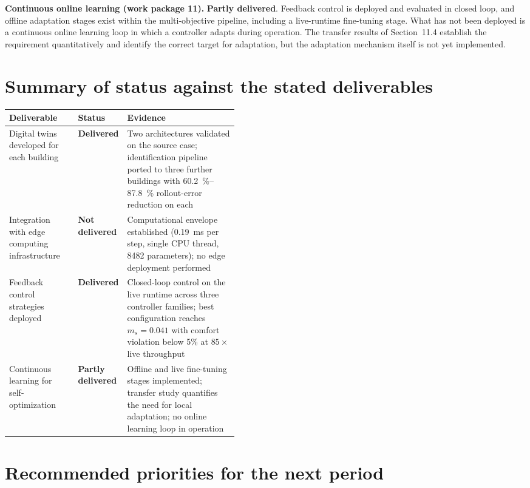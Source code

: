 \documentclass[11pt,a4paper]{article}
\newcommand{\ms}{\ensuremath{m_s}}
\newcommand{\done}{\textcolor{black!70}{\textbf{Delivered}}}
\newcommand{\partialx}{\textcolor{black!70}{\textbf{Partly delivered}}}
\newcommand{\notdone}{\textcolor{black!70}{\textbf{Not delivered}}}
\begin{document}
\textbf{Continuous online learning (work package 11).} \partialx. Feedback control is deployed
and evaluated in closed loop, and offline adaptation stages exist within the multi-objective
pipeline, including a live-runtime fine-tuning stage. What has not been deployed is a continuous
online learning loop in which a controller adapts during operation. The transfer results of
Section~11.4 establish the requirement quantitatively and identify the correct target for
adaptation, but the adaptation mechanism itself is not yet implemented.

\section*{Summary of status against the stated deliverables}

\begin{table}[h]
\centering\small
\begin{tabularx}{\linewidth}{@{}p{0.30\linewidth}p{0.14\linewidth}X@{}}
\toprule
Deliverable & Status & Evidence \\
\midrule
Digital twins developed for each building & \done & Two architectures validated on the source case; identification pipeline ported to three further buildings with \SIrange{60.2}{87.8}{\percent} rollout-error reduction on each \\
Integration with edge computing infrastructure & \notdone & Computational envelope established (\SI{0.19}{\milli\second} per step, single CPU thread, 8482 parameters); no edge deployment performed \\
Feedback control strategies deployed & \done & Closed-loop control on the live runtime across three controller families; best configuration reaches $\ms = 0.041$ with comfort violation below 5\% at $85\times$ live throughput \\
Continuous learning for self-optimization & \partialx & Offline and live fine-tuning stages implemented; transfer study quantifies the need for local adaptation; no online learning loop in operation \\
\bottomrule
\end{tabularx}
\end{table}

\section*{Recommended priorities for the next period}
\end{document}
